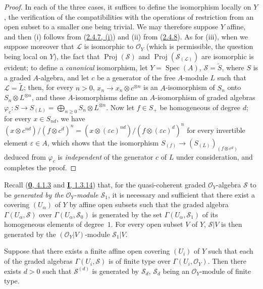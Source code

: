 \begin{proof}
In each of the three cases, it suffices to define the isomorphism locally on
$Y$, the verification of the compatibilities with the operations of
restriction from an open subset to a smaller one being trivial. We may
therefore suppose $Y$ affine, and then (i) follows from
(\hyperref[II.2.4.7]{2.4.7, (i)}) and (ii) from
(\hyperref[II.2.4.8]{2.4.8}). As for (iii), when we suppose moreover that
$\mathcal{L}$ is isomorphic to $\mathcal{O}_Y$ (which is permissible, the
question being local on $Y$), the fact that
$\operatorname{Proj}(\mathcal{S})$ and
$\operatorname{Proj}(\mathcal{S}_{(\mathcal{L})})$ are isomorphic is evident;
to define a \emph{canonical} isomorphism, let
$Y=\operatorname{Spec}(A)$, $\mathcal{S}=\widetilde{S}$, where $S$ is a
graded $A$-algebra, and let $c$ be a generator of the free $A$-module $L$
such that $\mathcal{L}=\widetilde{L}$; then, for every $n>0$,
$x_n\to x_n\otimes c^{\otimes n}$ is an $A$-isomorphism of $S_n$ onto
$S_n\otimes L^{\otimes n}$, and these $A$-isomorphisms define an
$A$-isomorphism of graded algebras $\varphi_c:S\to S_{(L)}
=\bigoplus_{n\geq0}S_n\otimes L^{\otimes n}$.
Now let $f\in S_+$ be homogeneous of degree $d$; for every $x\in S_{nd}$, we
have $(x\otimes c^{nd})/(f\otimes c^d)^n
=(x\otimes(\varepsilon c)^{nd})/(f\otimes(\varepsilon c)^d)^n$
for every invertible element $\varepsilon\in A$, which shows that the
isomorphism $S_{(f)}\to(S_{(L)})_{(f\otimes c^d)}$ deduced from $\varphi_c$
is \emph{independent} of the generator $c$ of $L$ under consideration, and
completes the proof.
\end{proof}

\begin{env}[3.1.9]
\label{II.3.1.9}
Recall (\hyperref[0.4.1.3]{\textbf{0}, 4.1.3} and
\hyperref[I.1.3.14]{\textbf{I}, 1.3.14}) that, for the quasi-coherent graded
$\mathcal{O}_Y$-algebra $\mathcal{S}$ to be \emph{generated by the
$\mathcal{O}_Y$-module $\mathcal{S}_1$}, it is necessary and sufficient that
there exist a covering $(U_\alpha)$ of $Y$ by affine open subsets such that
the graded algebra $\Gamma(U_\alpha,\mathcal{S})$ over
$\Gamma(U_\alpha,\mathcal{S}_0)$ is generated by the set
$\Gamma(U_\alpha,\mathcal{S}_1)$ of its homogeneous elements of degree~$1$.
For every open subset $V$ of $Y$, $\mathcal{S}|V$ is then generated by the
$(\mathcal{O}_Y|V)$-module $\mathcal{S}_1|V$.
\end{env}

\begin{proposition}[3.1.10]
\label{II.3.1.10}
Suppose that there exists a finite affine open covering $(U_i)$ of $Y$ such
that each of the graded algebras $\Gamma(U_i,\mathcal{S})$ is of finite type
over $\Gamma(U_i,\mathcal{O}_Y)$. Then there exists $d>0$ such that
$\mathcal{S}^{(d)}$ is generated by $\mathcal{S}_d$, $\mathcal{S}_d$ being
an $\mathcal{O}_Y$-module of finite type.
\end{proposition}

